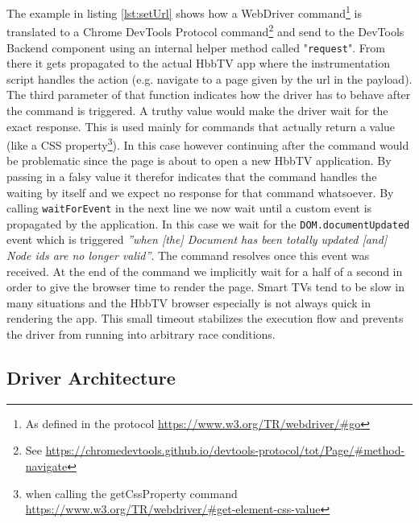 The example in listing \ref{lst:setUrl} shows how a WebDriver command\footnote{As defined in the protocol \url{https://www.w3.org/TR/webdriver/\#go}} is translated to a Chrome DevTools Protocol command\footnote{See \url{https://chromedevtools.github.io/devtools-protocol/tot/Page/\#method-navigate}} and send to the DevTools Backend component using an internal helper method called "\texttt{request}". From there it gets propagated to the actual HbbTV app where the instrumentation script handles the action (e.g. navigate to a page given by the url in the payload). The third parameter of that function indicates how the driver has to behave after the command is triggered. A truthy value would make the driver wait for the exact response. This is used mainly for commands that actually return a value (like a CSS property\footnote{when calling the getCssProperty command \url{https://www.w3.org/TR/webdriver/\#get-element-css-value}}). In this case however continuing after the command would be problematic since the page is about to open a new HbbTV application. By passing in a falsy value it therefor indicates that the command handles the waiting by itself and we expect no response for that command whatsoever. By calling \texttt{waitForEvent} in the next line we now wait until a custom event is propagated by the application. In this case we wait for the \texttt{DOM.documentUpdated} event which is triggered \textit{''when [the] Document has been totally updated [and] Node ids are no longer valid''}\cite{devtoolsprotocolDOM}. The command resolves once this event was received. At the end of the command we implicitly wait for a half of a second in order to give the browser time to render the page. Smart TVs tend to be slow in many situations and the HbbTV browser especially is not always quick in rendering the app. This small timeout stabilizes the execution flow and prevents the driver from running into arbitrary race conditions.

\subsection{Driver Architecture\label{sec:implDriver}}

